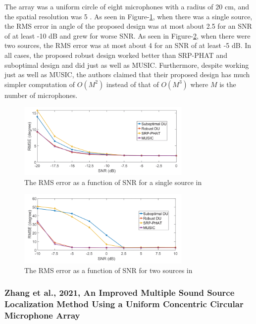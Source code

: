 \documentclass[notitlepage]{report}
\begin{document}
The array was a uniform circle of eight microphones with a radius of 20 \si{cm}, and the spatial resolution was 5 \si{\deg}. As seen in Figure-\ref{fig:salvati_2019_RMSE_SNR}, when there was a single source, the RMS error in angle of the proposed design was at most about 2.5 \si{\deg} for an SNR of at least -10 \si{dB} and grew for worse SNR. As seen in Figure-\ref{fig:salvati_2019_RMSE_SNR_two}, when there were two sources, the RMS error was at most about 4 \si{\deg} for an SNR of at least -5 \si{dB}. In all cases, the proposed robust design worked better than SRP-PHAT and suboptimal design and did just as well as MUSIC. Furthermore, despite working just as well as MUSIC, the authors claimed that their proposed design has much simpler computation of $O(M^2)$ instead of that of $O(M^3)$ where $M$ is the number of microphones.

\begin{figure}[H]
\includegraphics[width=0.75\textwidth]{./salvati_2019/RMSE_SNR.png}
\centering
\caption{The RMS error as a function of SNR for a single source in \cite{salvati_power_2019}}
\label{fig:salvati_2019_RMSE_SNR}
\centering
\end{figure}

\begin{figure}[H]
\includegraphics[width=0.75\textwidth]{./salvati_2019/RMSE_SNR_two.png}
\centering
\caption{The RMS error as a function of SNR for two sources in \cite{salvati_power_2019}}
\label{fig:salvati_2019_RMSE_SNR_two}
\centering
\end{figure}

\subsubsection{Zhang et al., 2021, An Improved Multiple Sound Source Localization Method Using a Uniform Concentric Circular Microphone Array}
\end{document}
